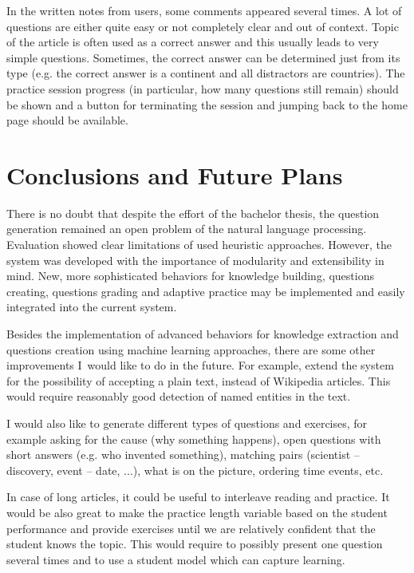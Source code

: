 \documentclass[12pt, twoside]{fithesis2}
\renewcommand{\_}{\leavevmode \kern0.07em\vbox{\hrule width0.4em}}
\newcounter{choice}
\begin{document}
In the written notes from users, some comments appeared several times.
A lot of questions are either quite easy or not completely clear and out of context.
Topic of the article is often used as a correct answer and this usually leads to very simple questions.
Sometimes, the correct answer can be determined just from its type
(e.g. the correct answer is a continent and all distractors are countries).
The practice session progress (in particular, how many questions still remain) should be shown
and a button for terminating the session and jumping back to the home page should be available.



\chapter{Conclusions and Future Plans}
\label{chap:future}

There is no doubt that despite the effort of the bachelor thesis,
the question generation remained an open problem of the natural language processing.
Evaluation showed clear limitations of used heuristic approaches.
However, the system was developed with the importance of modularity and extensibility in mind.
New, more sophisticated behaviors for knowledge building, questions creating, questions grading and adaptive practice may be implemented and easily integrated into the current system.

Besides the implementation of advanced behaviors for knowledge extraction and questions creation using machine learning approaches, there are some other improvements I~would like to do in the future.
For example, extend the system for the possibility of accepting a plain text, instead of Wikipedia articles.
This would require reasonably good detection of named entities in the text.


I would also like to generate different types of questions and exercises,
for example
asking for the cause (why something happens),
open questions with short answers (e.g. who invented something),
matching pairs (scientist -- discovery,  event -- date, ...),
what is on the picture,
ordering time events, etc.

In case of long articles, it could be useful to interleave reading and practice.
It would be also great to make the practice length variable based on the student performance and provide exercises until we are relatively confident that the student knows the topic.
This would require to possibly present one question several times and to use a student model which can capture learning.
\end{document}
